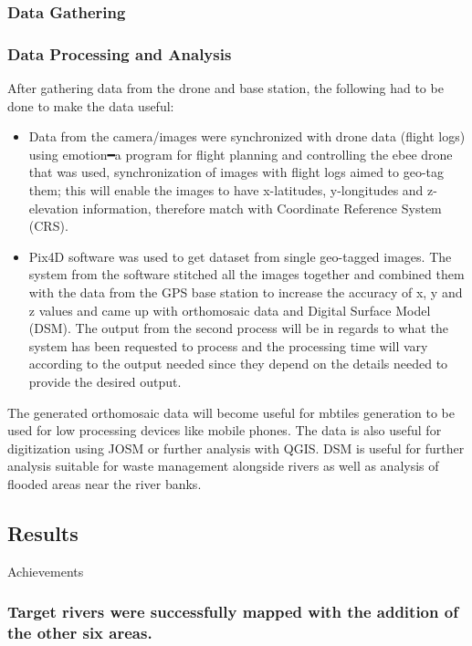 \documentclass[a4paper,12pt,twoside]{article}
\begin{document}
    \subsubsection{Data Gathering}
    
    \subsubsection{Data Processing and Analysis}
    After gathering data from the drone and base station, the following had to be done to make the data useful:
    \begin{itemize}
        \item Data from the camera/images were synchronized with drone data (flight logs) using emotion━a program for flight planning and controlling the ebee drone that was used, synchronization of images with flight logs aimed to geo-tag them; this will enable the images to have x-latitudes, y-longitudes and z-elevation information, therefore match with Coordinate Reference System (CRS).
        \item Pix4D software was used to get dataset from single geo-tagged images. The system from the software stitched all the images together and combined them with the data from the GPS base station to increase the accuracy of x, y and z values and came up with orthomosaic data and Digital Surface Model (DSM). The output from the second process will be in regards to what the system has been requested to process and the processing time will vary according to the output needed since they depend on the details needed to provide the desired output.
    \end{itemize}
    
    The generated orthomosaic data will become useful for mbtiles generation to be used for low processing devices like mobile phones. The data is also useful for digitization using JOSM or further analysis with QGIS. DSM is useful for further analysis suitable for waste management alongside rivers as well as analysis of flooded areas near the river banks.
    
\subsection{Results}
    Achievements

    \subsubsection{Target rivers were successfully mapped with the addition of the other six areas.}
\end{document}
